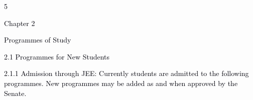 \documentclass[12pt]{article}
\begin{document}
\vspace{\baselineskip}

\vspace{\baselineskip}

\vspace{\baselineskip}

\vspace{\baselineskip}

\vspace{\baselineskip}

\vspace{\baselineskip}

\vspace{\baselineskip}
\begin{Center}
\textcolor[HTML]{00000A}{5}
\end{Center}\par


\vspace{\baselineskip}
{\fontsize{14pt}{16.8pt}\selectfont \textcolor[HTML]{00000A}{Chapter 2}\par}\par


\vspace{\baselineskip}
{\fontsize{20pt}{24.0pt}\selectfont \textcolor[HTML]{00000A}{Programmes of Study}\par}\par


\vspace{\baselineskip}
\textcolor[HTML]{00000A}{2.1 Programmes for New Students}\par


\vspace{\baselineskip}
\begin{adjustwidth}{0.0in}{0.38in}
{\fontsize{10pt}{12.0pt}\selectfont \textcolor[HTML]{00000A}{2.1.1 Admission through JEE: Currently students are admitted to the following programmes. New programmes may be added as and when approved by the Senate.}\par}\par

\end{adjustwidth}
\end{document}
